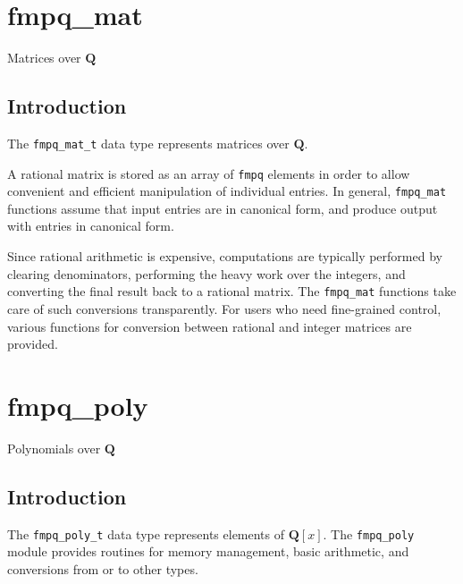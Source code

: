 \documentclass[a4paper,10pt]{book}
\newcommand{\Q}{\mathbf{Q}}%
\newcommand{\code}{\lstinline}
\begin{document}
{{%

\chapter{fmpq\_mat}
\epigraph{Matrices over $\Q$}{}

\section{Introduction}

The \code{fmpq_mat_t} data type represents matrices over $\Q$.

A rational matrix is stored as an array of \code{fmpq} elements in order
to allow convenient and efficient manipulation of individual entries.
In general, \code{fmpq_mat} functions assume that input entries are
in canonical form, and produce output with entries in canonical form.

Since rational arithmetic is expensive, computations are typically performed
by clearing denominators, performing the heavy work over the integers,
and converting the final result back to a rational matrix. The
\code{fmpq_mat} functions take care of such conversions transparently.
For users who need fine-grained control, various
functions for conversion between rational and integer matrices are provided.




\chapter{fmpq\_poly}
\epigraph{Polynomials over $\Q$}{}

\section{Introduction}

The \code{fmpq_poly_t} data type represents elements of $\Q[x]$. The
\code{fmpq_poly} module provides routines for memory management, basic
arithmetic, and conversions from or to other types.

}}
\end{document}
